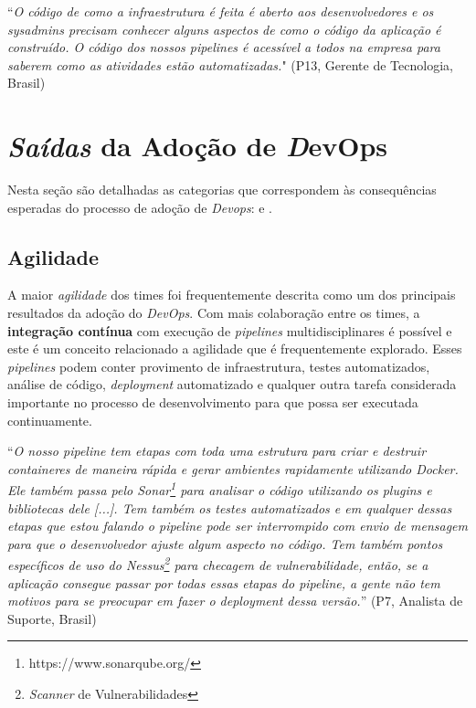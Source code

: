 \begin{mq}
``\emph{O código de como a infraestrutura é feita é aberto aos desenvolvedores
e os sysadmins precisam conhecer alguns aspectos de como o código da aplicação
é construído. O código dos nossos pipelines é acessível a todos na empresa
para saberem como as atividades estão automatizadas.}"
(P13, Gerente de Tecnologia, Brasil)
\end{mq}

\section{\emph{Saídas} da Adoção de {\emph DevOps}}\label{secao_saidas}

Nesta seção são detalhadas as categorias que correspondem às consequências
esperadas do processo de adoção de {\it Devops}:  e .

\subsection{Agilidade}\label{subsecao_agilidade}

A maior {\it agilidade} dos times foi frequentemente descrita como um dos
principais resultados da adoção do {\it DevOps}. Com mais colaboração entre os
times, a {\bf integração contínua} com execução de {\it pipelines}
multidisciplinares é possível e este é um conceito relacionado a agilidade que
é frequentemente explorado. Esses {\it pipelines} podem conter provimento
de infraestrutura, testes automatizados, análise de código, {\it deployment}
automatizado e qualquer outra tarefa considerada importante no processo de
desenvolvimento para que possa ser executada continuamente.

\begin{mq}
``\emph{O nosso pipeline tem etapas com toda uma estrutura para criar e destruir
containeres de maneira rápida e gerar ambientes rapidamente utilizando Docker.
Ele também passa pelo Sonar\footnote{https://www.sonarqube.org/} para
analisar o código utilizando os plugins e bibliotecas dele [...]. Tem também os
testes automatizados e em qualquer dessas etapas que estou falando o pipeline
pode ser interrompido com envio de mensagem para que o desenvolvedor ajuste
algum aspecto no código. Tem também pontos específicos de uso do Nessus\footnote{{\it Scanner} de Vulnerabilidades}
para checagem de vulnerabilidade, então, se a aplicação consegue passar por
todas essas etapas do pipeline, a gente não tem motivos para se preocupar em
fazer o deployment dessa versão.}'' (P7, Analista de Suporte, Brasil)
\end{mq}

